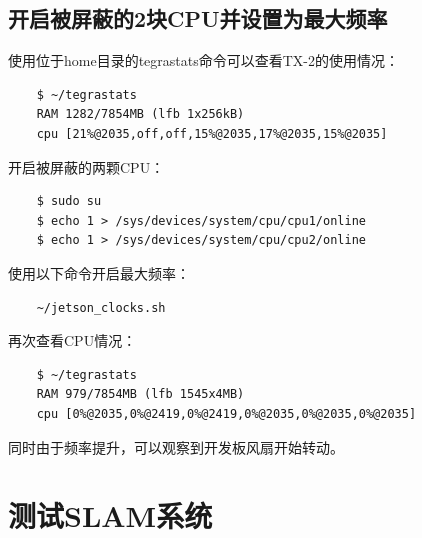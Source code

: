 \documentclass{article}
\begin{document}
\subsection{开启被屏蔽的2块CPU并设置为最大频率}
使用位于home目录的tegrastats命令可以查看TX-2的使用情况：
\begin{lstlisting}
    $ ~/tegrastats
    RAM 1282/7854MB (lfb 1x256kB)
    cpu [21%@2035,off,off,15%@2035,17%@2035,15%@2035]
\end{lstlisting}
开启被屏蔽的两颗CPU：
\begin{lstlisting}
    $ sudo su
    $ echo 1 > /sys/devices/system/cpu/cpu1/online
    $ echo 1 > /sys/devices/system/cpu/cpu2/online    
\end{lstlisting}
使用以下命令开启最大频率：
\begin{lstlisting}
    ~/jetson_clocks.sh
\end{lstlisting}
再次查看CPU情况：
\begin{lstlisting}
    $ ~/tegrastats
    RAM 979/7854MB (lfb 1545x4MB)
    cpu [0%@2035,0%@2419,0%@2419,0%@2035,0%@2035,0%@2035]
\end{lstlisting}
同时由于频率提升，可以观察到开发板风扇开始转动。

\section{测试SLAM系统}
\end{document}
